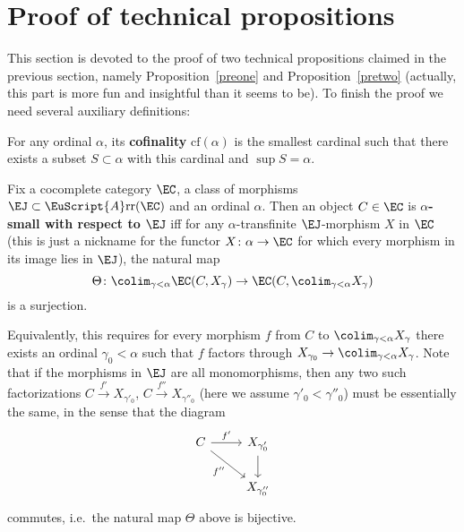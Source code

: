 \documentclass[twoside]{article}
\begin{document}
\section{Proof of technical propositions}

This section is devoted to the proof of two technical propositions claimed in the previous section, namely Proposition~\ref{preone} and Proposition~\ref{pretwo} (actually, this part is more fun and insightful than it seems to be). To finish the proof we need several auxiliary definitions:

\begin{defn}
For any ordinal $\alpha$, its \textbf{cofinality} $\mathrm{cf}(\alpha)$ is the smallest cardinal such that there exists a subset $S \subset \alpha$ with this cardinal and $\sup S = \alpha$.
\end{defn}

\begin{defn}
Fix a cocomplete category $\EC$, a class of morphisms $\EJ \subset \EuScript{A}\mathrm{rr}(\EC)$ and an ordinal $\alpha$. Then an object $C \in \EC$ is \textbf{$\alpha$-small with respect to $\EJ$} iff for any $\alpha$-transfinite $\EJ$-morphism $X$ in $\EC$ (this is just a nickname for the functor $X\colon \alpha  \rightarrow \EC$ for which every morphism in its image lies in $\EJ$), the natural map
$$\Theta\colon \colim_{\gamma < \alpha} \EC(C, X_\gamma) \rightarrow \EC(C, \colim_{\gamma < \alpha} X_\gamma)$$
is a surjection.
\end{defn}

\begin{rem}
Equivalently, this requires for every morphism $f$ from $C$ to $\colim_{\gamma < \alpha} X_\gamma$ there exists an ordinal $\gamma_0 < \alpha$ such that $f$ factors through $X_{\gamma_0} \rightarrow \colim_{\gamma < \alpha} X_\gamma$. Note that if the morphisms in $\EJ$ are all monomorphisms, then any two such factorizations $C \xrightarrow{f'} X_{\gamma'_0}$, $C \xrightarrow{f''} X_{\gamma''_0}$ (here we assume $\gamma'_0 < \gamma''_0$) must be essentially the same, in the sense that the diagram
$$\begin{tikzcd}
    C \ar[r, "f'"] \ar[rd, "f''"']& X_{\gamma'_0}\ar[d]\\
& X_{\gamma''_0}
\end{tikzcd}$$
commutes, i.e.\ the natural map $\Theta$ above is bijective.
\end{rem}
\end{document}
